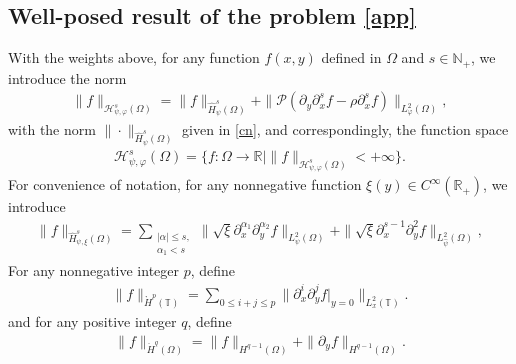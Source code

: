 \documentclass{amsart}
\numberwithin{equation}{section}
\begin{document}
\subsection{Well-posed result of the problem \eqref{app}}


With the weights above, for any function $f(x,y)$ defined in $\Omega$ and $s\in\mathbb{N}_{+}$, we introduce the norm
\begin{align*}
\|f\|_{\mathcal{H}_{\psi,\varphi}^{s}(\Omega)}
= \|f\|_{\hat{H}_{\psi}^{s}(\Omega)}
 +\|\mathcal{P}(\partial_{y}\partial_{x}^{s}f-\rho\partial_{x}^{s}f)\|_{L_{\varphi}^{2}(\Omega)},
\end{align*}
with the norm $\|\cdot\|_{\hat{H}_{\psi}^{s}(\Omega)}$ given in \eqref{cn}, and correspondingly, the function space
\begin{align*}
\mathcal{H}_{\psi,\varphi}^{s}(\Omega)=\{f:\Omega\to\mathbb{R}|\|f\|_{\mathcal{H}_{\psi,\varphi}^{s}(\Omega)}<+\infty\}.
\end{align*}
For convenience of notation, for any nonnegative function $\xi(y)\in C^{\infty}(\mathbb{R}_{+})$, we introduce
\begin{align*}
\|f\|_{\hat{H}_{\psi,\xi}^{s}(\Omega)}
= \sum_{\substack{|\alpha|\leq s,\\ \alpha_{1}<s}}\|\sqrt{\xi}\partial_{x}^{\alpha_{1}}\partial_{y}^{\alpha_{2}}f\|_{L_{\psi}^{2}(\Omega)}
 +\|\sqrt{\xi}\partial_{x}^{s-1}\partial_{y}^{2}f\|_{L_{\hat{\psi}}^{2}(\Omega)},
\end{align*}
For any nonnegative integer $p$, define
\begin{align*}
\|f\|_{\mathring{H}^{p}(\mathbb{T})}=\sum_{0\leq i+j\leq p}\|\partial_{x}^{i}\partial_{y}^{j}f|_{y=0}\|_{L_{x}^{2}(\mathbb{T})}.
\end{align*}
and for any positive integer $q$, define
\begin{align*}
\|f\|_{\ddot{H}^{q}(\Omega)}=\|f\|_{H^{q-1}(\Omega)}+\|\partial_{y}f\|_{H^{q-1}(\Omega)}.
\end{align*}
\end{document}
